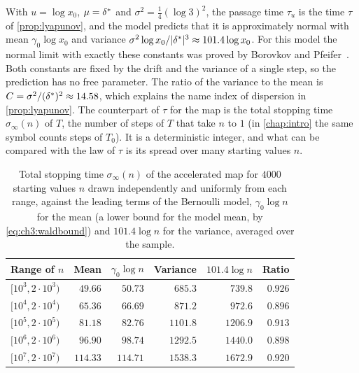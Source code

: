 With $u=\log x_0$, $\mu=\delta^{*}$ and $\sigma^2=\frac14(\log3)^2$, the passage time
$\tau_u$ is the time $\tau$ of \cref{prop:lyapunov}, and the model
predicts that it is approximately normal with mean
$\gamma_0\log x_0$ and variance $\sigma^2\log x_0/|\delta^{*}|^3\approx101.4\log x_0$.
For this model the normal limit with exactly these constants was proved by
Borovkov and Pfeifer~\cite[Theorem~5]{borovkov2001}.
Both constants are fixed by the drift and the variance of a single step, so the
prediction has no free parameter.
The ratio of the variance to the mean is $C=\sigma^2/(\delta^{*})^2\approx14.58$,
which explains the name index of dispersion in \cref{prop:lyapunov}.
The counterpart of $\tau$ for the map is the total stopping time
$\sigma_\infty(n)$ of $T$, the number of steps of $T$ that take $n$ to $1$ (in
\cref{chap:intro} the same symbol counts steps of $T_0$). It is a deterministic
integer, and what can be compared with the law of $\tau$ is its spread over
many starting values $n$.

\begin{table}[t]
\centering
\caption{Total stopping time $\sigma_\infty(n)$ of the accelerated map for
$4000$ starting values $n$ drawn independently and uniformly from each range,
against the leading terms of the Bernoulli model, $\gamma_0\log n$ for the mean (a lower bound for the model mean, by \eqref{eq:ch3:waldbound}) and $101.4\log n$ for the variance, averaged over the sample.}
\label{tab:ch3:clt}
\small
\begin{tabular}{@{}lrrrrr@{}}
\toprule
Range of $n$ & Mean & $\gamma_0\log n$ & Variance & $101.4\log n$ & Ratio\\
\midrule
$[10^3,2\cdot10^3)$ & $49.66$ & $50.73$ & $685.3$ & $739.8$ & $0.926$\\
$[10^4,2\cdot10^4)$ & $65.36$ & $66.69$ & $871.2$ & $972.6$ & $0.896$\\
$[10^5,2\cdot10^5)$ & $81.18$ & $82.76$ & $1101.8$ & $1206.9$ & $0.913$\\
$[10^6,2\cdot10^6)$ & $96.90$ & $98.74$ & $1292.5$ & $1440.0$ & $0.898$\\
$[10^7,2\cdot10^7)$ & $114.33$ & $114.71$ & $1538.3$ & $1672.9$ & $0.920$\\
\bottomrule
\end{tabular}
\end{table}

